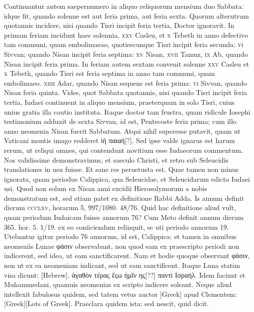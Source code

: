 Continuantur autem saepernumero in aliquo reliquorum mensium
duo Sabbata: idque fit, quando solenne est aut feria prima, aut feria
sexta.
Quorum alterutrum quotannis incidere, nisi quando Tisri
incipit feria tertia, Doctor ignoravit.
In primam feriam incidunt
haec solennia, \textsc{xxv} Casleu, et \textsc{x} Tebeth in anno defectivo tam
communi, quam embolimaeao, quotiescunque Tisri incipit feria secunda:
\textsc{vi} Sivvan; quando Nisan incipit feria septima:
\textsc{xv} Nisan, \textsc{xvii} Tamuz,
\textsc{ix} Ab, quando Nisan incipit feria prima.
In feriam autem sextam
convenit solenne \textsc{xxv} Casleu et
 \textsc{x} Tebeth, quando Tisri est feria
septima in anno tam communi, quam embolimaeo.
\textsc{xiiii} Adar, quando
Nisan sequens est feria prima: \textsc{vi} Sivvan, quando Nisan feria quinta.
Vides, quot Sabbata quotannis, nisi quando Tisri incipit
 feria tertia, Iudaei
continuent in aliquo mensium, praeterquam in solo Tisri, cuius
unius gratia illa cautio instituta.
Itaque doctor tam frustra, quam ridicule
Iosephi testimonium adduxit de sexta Sivvan, id est, Pentecoste
feria prima; cum illo anno neomenia Nisan fuerit Sabbatum.
Atqui
nihil superesse putavit, quam ut Vaticani montis imago redderet
\textgreek{ἰὴ παιαή[?]}.
Sed ipse valde ignarus est harum rerum, ut reliqui omnes,
qui contendunt novitium esse Iudaeorum commentum.
Nos
validissime demonstravimus, et saeculo Christi, et retro sub Seleucidis
translationes in usu fuisse.
Et sane res peruetusta est.
Quae tamen
non minus ignorata, quam periodus Calippica, qua Seleucidae, et
Seleucidarum edicto Iudaei usi.
Quod non solum ex Nisan anni excidii
Hierosolymorum a nobis demonstratum est, sed etiam patet
ex definitione Rabbi Adda.
Is annum definit dierum \textsc{ccclxv},
horarum 5, 997/1080. 48/76.
Quid hac definitione aliud vult, quam periodum
Iudaicam fuisse annorum 76?
Cum Meto definit annum dierum
365. hor. 5. 1/19. ex eo coniiciendum relinquit, se uti periodo annorum
19.
Utebantur igitur periodo 76 annorum, id est, Calippica:
et tamen in omnibus neomeniis Lunae \textgreek{φάσιν} observabant, non
quod eam ex praescripto periodi non indicerent, sed ideo, ut eam
sanctificarent.
Nam et hodie quoque observant \textgreek{φάσιν}, non ut ex ea
neomeniam indicant, sed ut eam sanctificent.
Itaque Luna statim
visa dicunt: \texthebrew{[Hebrew]}.
\textgreek{ἀγαθὸν τέρας ἔςω ἡμῖν ης[??] παντὶ Ισραήλ.}
Idem faciunt et Muhammedani, quamuis neomenias ex
scripto indicere soleant.
Neque aliud intellexit fabulosus quidem,
sed tatem vetus auctor \textgreek{[Greek]} apud Clementem:
\textgreek{[Greek][Lots of Greek]}.
Praeclara quidem ista: sed nescit, quid dicit.

